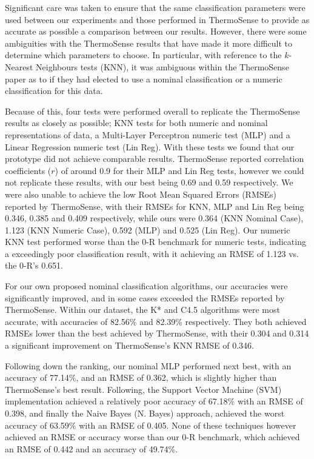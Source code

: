 \documentclass[../thesis/thesis.tex]{subfiles}
\begin{document}
Significant care was taken to ensure that the same classification parameters were used between our experiments and those performed in ThermoSense to provide as accurate as possible a comparison between our results. However, there were some ambiguities with the ThermoSense results that have made it more difficult to determine which parameters to choose. In particular, with reference to the $k$-Nearest Neighbours tests (KNN), it was ambiguous within the ThermoSense paper as to if they had elected to use a nominal classification or a numeric classification for this data.

Because of this, four tests were performed overall to replicate the ThermoSense results as closely as possible; KNN tests for both numeric and nominal representations of data, a Multi-Layer Perceptron numeric test (MLP) and a Linear Regression numeric test (Lin Reg). With these tests we found that our prototype did not achieve comparable results. ThermoSense reported correlation coefficients ($r$) of around 0.9 for their MLP and Lin Reg tests, however we could not replicate these results, with our best being 0.69 and 0.59 respectively. We were also unable to achieve the low Root Mean Squared Errors (RMSEs) reported by ThermoSense, with their RMSEs for KNN, MLP and Lin Reg being 0.346, 0.385 and 0.409 respectively, while ours were 0.364 (KNN Nominal Case), 1.123 (KNN Numeric Case), 0.592 (MLP) and 0.525 (Lin Reg). Our numeric KNN test performed worse than the 0-R benchmark for numeric tests, indicating a exceedingly poor classification result, with it achieving an RMSE of 1.123 vs. the 0-R's 0.651.

For our own proposed nominal classification algorithms, our accuracies were significantly improved, and in some cases exceeded the RMSEs reported by ThermoSense. Within our dataset, the K* and C4.5 algorithms were most accurate, with accuracies of 82.56\% and 82.39\% respectively. They both achieved RMSEs lower than the best achieved by ThermoSense, with their 0.304 and 0.314 a significant improvement on ThermoSense's KNN RMSE of 0.346.

Following down the ranking, our nominal MLP performed next best, with an accuracy of 77.14\%, and an RMSE of 0.362, which is slightly higher than ThermoSense's best result. Following, the Support Vector Machine (SVM) implementation achieved a relatively poor accuracy of 67.18\% with an RMSE of 0.398, and finally the Naive Bayes (N. Bayes) approach, achieved the worst accuracy of 63.59\% with an RMSE of 0.405. None of these techniques however achieved an RMSE or accuracy worse than our 0-R benchmark, which achieved an RMSE of 0.442 and an accuracy of 49.74\%.
\end{document}

